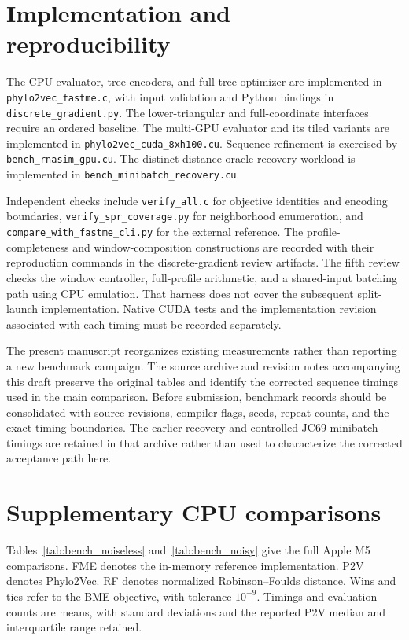 \section{Implementation and reproducibility}
\label{sec:software}

The CPU evaluator, tree encoders, and full-tree optimizer are implemented in
\texttt{phylo2vec\_fastme.c}, with input validation and Python bindings in
\texttt{discrete\_gradient.py}.
The lower-triangular and full-coordinate interfaces require an ordered baseline.
The multi-GPU evaluator and its tiled variants are implemented in
\texttt{phylo2vec\_cuda\_8xh100.cu}.
Sequence refinement is exercised by \texttt{bench\_rnasim\_gpu.cu}.
The distinct distance-oracle recovery workload is implemented in
\texttt{bench\_minibatch\_recovery.cu}.

Independent checks include \texttt{verify\_all.c} for objective identities and encoding boundaries,
\texttt{verify\_spr\_coverage.py} for neighborhood enumeration, and
\texttt{compare\_with\_fastme\_cli.py} for the external reference.
The profile-completeness and window-composition constructions are recorded with their reproduction commands in the discrete-gradient review artifacts.
The fifth review checks the window controller, full-profile arithmetic, and a shared-input batching path using CPU emulation.
That harness does not cover the subsequent split-launch implementation.
Native CUDA tests and the implementation revision associated with each timing must be recorded separately.

The present manuscript reorganizes existing measurements rather than reporting a new benchmark campaign.
The source archive and revision notes accompanying this draft preserve the original tables and identify the corrected sequence timings used in the main comparison.
Before submission, benchmark records should be consolidated with source revisions, compiler flags, seeds, repeat counts, and the exact timing boundaries.
The earlier recovery and controlled-JC69 minibatch timings are retained in that archive rather than used to characterize the corrected acceptance path here.

\clearpage
\section{Supplementary CPU comparisons}
\label{sec:cpu_tables}

Tables~\ref{tab:bench_noiseless} and~\ref{tab:bench_noisy} give the full Apple M5 comparisons.
FME denotes the in-memory reference implementation.
P2V denotes Phylo2Vec.
RF denotes normalized Robinson--Foulds distance.
Wins and ties refer to the BME objective, with tolerance $10^{-9}$.
Timings and evaluation counts are means, with standard deviations and the reported P2V median and interquartile range retained.

